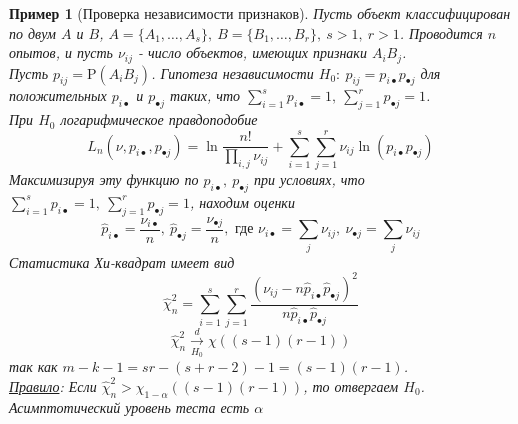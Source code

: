 \documentclass[12pt]{article}
\newtheorem*{example}{Пример}
\theoremstyle{basic_theorem}
\theoremstyle{name_theorem}
\def\P{ \mathrm{P} }
\begin{document}
\begin{example}[Проверка независимости признаков]
    Пусть объект классифицирован по двум $A$ и $B$,
    $A=\{A_1,\ldots,A_s\},\ B=\{B_1,\ldots,B_r\},\ s>1,\ r>1$.
    Проводится $n$ опытов, и пусть $\nu_{ij}$ - число объектов,
    имеющих признаки $A_iB_j$. \\
    Пусть $p_{ij}=\P(A_iB_j)$. Гипотеза независимости
    $H_0:\ p_{ij}=p_{i\bullet}p_{\bullet j}$ для положительных $p_{i\bullet}$ и $p_{\bullet j}$
    таких, что $\sum_{i=1}^sp_{i\bullet}=1,\ \sum_{j=1}^rp_{\bullet j}=1$. \\
    При $H_0$ логарифмическое правдоподобие
    \[L_n(\nu,p_{i\bullet},p_{\bullet j})=\ln\frac{n!}{\prod_{i,j}\nu_{ij}}+\sum_{i=1}^s\sum_{j=1}^r\nu_{ij}\ln(p_{i\bullet}p_{\bullet j})\]
    Максимизируя эту функцию по $p_{i\bullet},\ p_{\bullet j}$ при условиях, что $\sum_{i=1}^sp_{i\bullet}=1,\ \sum_{j=1}^rp_{\bullet j}=1$,
    находим оценки
    \[\widehat{p}_{i\bullet}=\frac{\nu_{i\bullet}}{n},\ \widehat{p}_{\bullet j}=\frac{\nu_{\bullet j}}{n},\text{ где } \nu_{i\bullet}=\sum_{j}\nu_{ij},\ \nu_{\bullet j}=\sum_{j}\nu_{ij}\]
    Статистика Хи-квадрат имеет вид
    \[\widehat{\chi}_n^2=\sum_{i=1}^s\sum_{j=1}^r\frac{(\nu_{ij}-n\widehat{p}_{i\bullet}\widehat{p}_{\bullet j})^2}{n\widehat{p}_{i\bullet}\widehat{p}_{\bullet j}}\]
    \[\widehat{\chi}_n^2\xrightarrow[H_0]{d}\chi((s-1)(r-1))\]
    так как $m-k-1=sr-(s+r-2)-1=(s-1)(r-1)$. \\
    \underline{Правило}: Если $\widehat{\chi}_n^2>\chi_{1-\alpha}((s-1)(r-1))$,
    то отвергаем $H_0$. Асимптотический уровень теста есть $\alpha$
\end{example}
\end{document}
